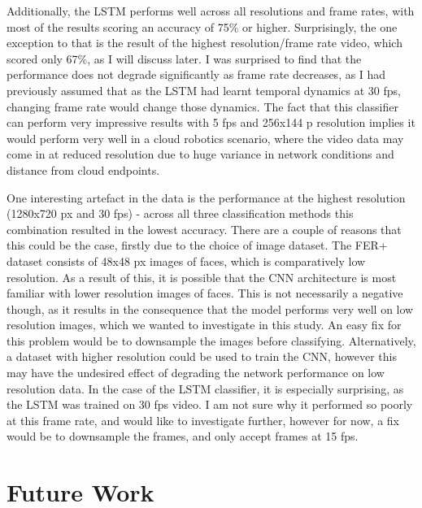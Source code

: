 \documentclass[sigconf]{acmart}
\begin{document}
{Additionally, the LSTM performs well across all resolutions and frame rates,
with most of the results scoring an accuracy of 75\% or higher. Surprisingly,
the one exception to that is the result of the highest resolution/frame rate
video, which
scored only 67\%, as I will discuss later. 
I was surprised to find that the performance does not degrade significantly as frame rate
decreases, as I had previously assumed that as the LSTM had learnt temporal
dynamics at 30 fps, changing frame rate would change those dynamics.
The fact that this classifier can
perform very impressive results with 5 fps and 256x144 p resolution implies it
would perform very well in a cloud robotics scenario, where the video data may
come in at reduced resolution due to huge variance in network conditions and
distance from cloud endpoints.

One interesting artefact in the data is the performance at the highest
resolution (1280x720 px and 30 fps) - across all three classification methods
this combination resulted in the lowest accuracy.
There are a couple of
reasons that this could be the case, firstly due to the choice of image
dataset. The FER+ dataset consists of 48x48 px images of faces, which is
comparatively low resolution. As a result of this, it is possible that
the CNN architecture is most familiar with lower resolution images of faces.
This is not necessarily a negative though, as it results in the consequence
that the model performs very well on low resolution images, which we wanted to
investigate
in this study. 
An easy fix for this problem would be to downsample the images before
classifying. Alternatively, a dataset with higher resolution could be used to train the
CNN, however this may have the undesired effect of degrading the network
performance on low resolution data.
In the case of the LSTM classifier, it is especially surprising, as the LSTM
was trained on 30 fps video. I am not sure why it performed so poorly at this
frame rate, and would like to investigate further, however for now, a fix
would be to downsample the frames, and only accept frames at 15 fps.


\section{Future Work}

}
\end{document}
